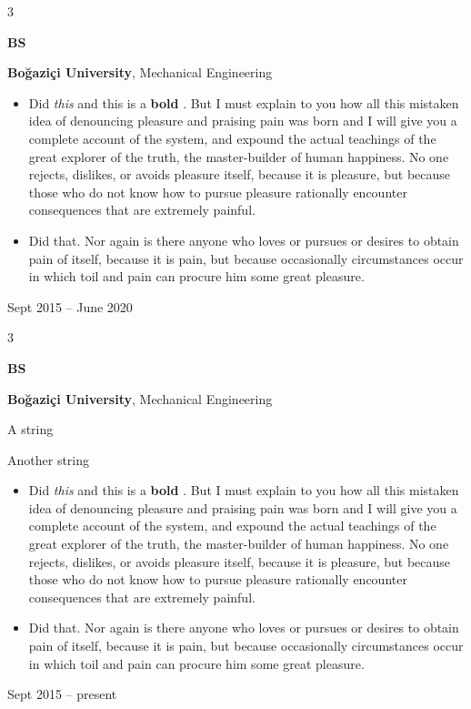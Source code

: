 \documentclass[10pt, letterpaper]{article}
\newenvironment{summary}{
    \begin{description}[
        topsep=0.10 cm,
        parsep=0.10 cm,
        partopsep=0pt,
        itemsep=0pt,
        leftmargin=0.4 cm + 10pt
    ]
}{
    \end{description}
} %
\newenvironment{highlights}{
    \begin{itemize}[
        topsep=0.10 cm,
        parsep=0.10 cm,
        partopsep=0pt,
        itemsep=0pt,
        leftmargin=0.4 cm + 10pt
    ]
}{
    \end{itemize}
} %
\newenvironment{threecolentry}[3][]{
    \onecolentry
    \def\thirdColumn{#3}
    \setcolumnwidth{1 cm, \fill, 4.5 cm}
    \begin{paracol}{3}
    {\raggedright #2} \switchcolumn
}{
    \switchcolumn \raggedleft \thirdColumn
    \end{paracol}
    \endonecolentry
} %
\let\hrefWithoutArrow\href
\renewcommand{\href}[2]{\hrefWithoutArrow{#1}{\ifthenelse{\equal{#2}{}}{ }{#2 }\raisebox{.15ex}{\footnotesize \faExternalLink*}}}
\begin{document}
        \begin{threecolentry}{\textbf{BS}}{
            Sept 2015 – June 2020
        }
            \textbf{Boğaziçi University}, Mechanical Engineering
            \begin{highlights}
                \item Did \textit{this} and this is a \textbf{bold} \href{https://example.com}{link}. But I must explain to you how all this mistaken idea of denouncing pleasure and praising pain was born and I will give you a complete account of the system, and expound the actual teachings of the great explorer of the truth, the master-builder of human happiness. No one rejects, dislikes, or avoids pleasure itself, because it is pleasure, but because those who do not know how to pursue pleasure rationally encounter consequences that are extremely painful.
                \item Did that. Nor again is there anyone who loves or pursues or desires to obtain pain of itself, because it is pain, but because occasionally circumstances occur in which toil and pain can procure him some great pleasure.
            \end{highlights}
        \end{threecolentry}

        \vspace{0.2 cm}

        \begin{threecolentry}{\textbf{BS}}{
            Sept 2015 – present
        }
            \textbf{Boğaziçi University}, Mechanical Engineering
            \begin{summary}
                \item A string
                \item Another string
            \end{summary}
            \begin{highlights}
                \item Did \textit{this} and this is a \textbf{bold} \href{https://example.com}{link}. But I must explain to you how all this mistaken idea of denouncing pleasure and praising pain was born and I will give you a complete account of the system, and expound the actual teachings of the great explorer of the truth, the master-builder of human happiness. No one rejects, dislikes, or avoids pleasure itself, because it is pleasure, but because those who do not know how to pursue pleasure rationally encounter consequences that are extremely painful.
                \item Did that. Nor again is there anyone who loves or pursues or desires to obtain pain of itself, because it is pain, but because occasionally circumstances occur in which toil and pain can procure him some great pleasure.
            \end{highlights}
        \end{threecolentry}
\end{document}
